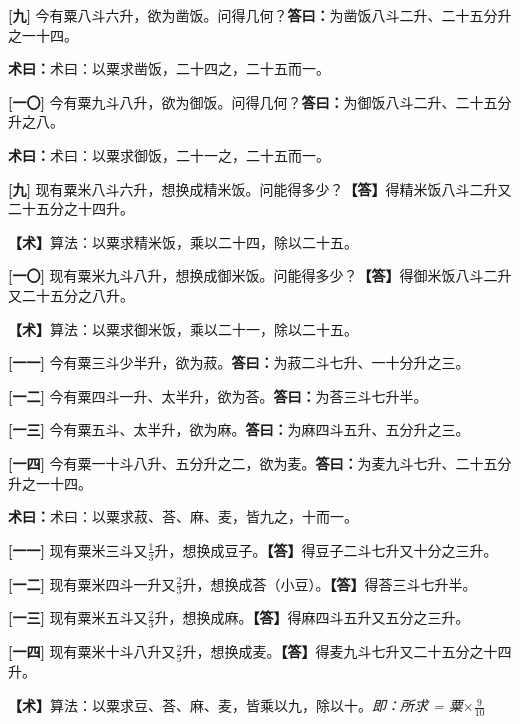 \documentclass[10pt,a4paper]{article}
\newlength{\lw}
\newlength{\rw}
\newcommand{\bilingc}[2]{%
  \par\vspace{0.1em}%
  \noindent\begin{minipage}[t]{\lw}
  {\small #1}
  \end{minipage}%
  \hfill%
  \begin{minipage}[t]{\rw}
  {\small #2}
  \end{minipage}%
  \vspace{0.1em}%
}
\newcommand{\da}{\textbf{\textcolor{answercolor}{答曰：}}}
\newcommand{\daB}{\textbf{\textcolor{answercolor}{【答】}}}
\newcommand{\shu}{\textbf{\textcolor{methodcolor}{术曰：}}}
\newcommand{\shuB}{\textbf{\textcolor{methodcolor}{【术】}}}
\newcommand{\pn}[1]{\textbf{[#1]}}
\newcommand{\sk}{\vspace{0.1em}}
\begin{document}
\sk

\bilingc{
\pn{九} 今有粟八斗六升，欲为凿饭。问得几何？\quad\da 为凿饭八斗二升、二十五分升之一十四。

\shu 术曰：以粟求凿饭，二十四之，二十五而一。

\pn{一〇} 今有粟九斗八升，欲为御饭。问得几何？\quad\da 为御饭八斗二升、二十五分升之八。

\shu 术曰：以粟求御饭，二十一之，二十五而一。
}{
\pn{九} 现有粟米八斗六升，想换成精米饭。问能得多少？\quad\daB 得精米饭八斗二升又二十五分之十四升。

\shuB 算法：以粟求精米饭，乘以二十四，除以二十五。

\pn{一〇} 现有粟米九斗八升，想换成御米饭。问能得多少？\quad\daB 得御米饭八斗二升又二十五分之八升。

\shuB 算法：以粟求御米饭，乘以二十一，除以二十五。
}

\vspace{0.3em}

\bilingc{
\pn{一一} 今有粟三斗少半升，欲为菽。\quad\da 为菽二斗七升、一十分升之三。

\pn{一二} 今有粟四斗一升、太半升，欲为荅。\quad\da 为荅三斗七升半。

\pn{一三} 今有粟五斗、太半升，欲为麻。\quad\da 为麻四斗五升、五分升之三。

\pn{一四} 今有粟一十斗八升、五分升之二，欲为麦。\quad\da 为麦九斗七升、二十五分升之一十四。

\shu 术曰：以粟求菽、荅、麻、麦，皆九之，十而一。
}{
\pn{一一} 现有粟米三斗又$\frac13$升，想换成豆子。\quad\daB 得豆子二斗七升又十分之三升。

\pn{一二} 现有粟米四斗一升又$\frac23$升，想换成荅（小豆）。\quad\daB 得荅三斗七升半。

\pn{一三} 现有粟米五斗又$\frac23$升，想换成麻。\quad\daB 得麻四斗五升又五分之三升。

\pn{一四} 现有粟米十斗八升又$\frac25$升，想换成麦。\quad\daB 得麦九斗七升又二十五分之十四升。

\shuB 算法：以粟求豆、荅、麻、麦，皆乘以九，除以十。\textit{即：所求 = 粟$\times\frac{9}{10}$}
}

\vspace{0.3em}
\end{document}
